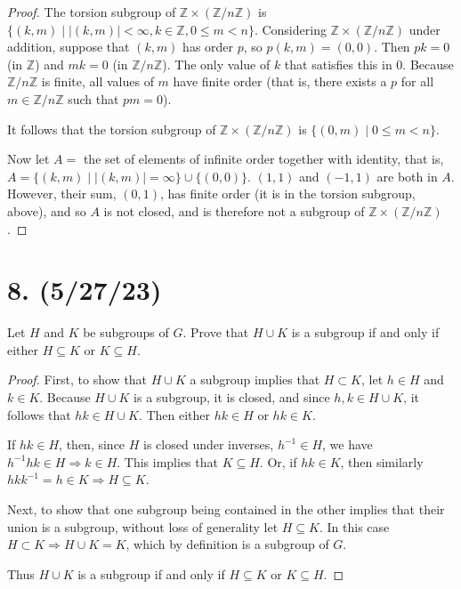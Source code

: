 \documentclass{article}
\begin{document}
\begin{proof}
    The torsion subgroup of $\mathbb{Z} \times (\mathbb{Z}/n\mathbb{Z})$ is $\{ (k, m) \mid |(k, m)| < \infty, k \in \mathbb{Z}, 0 \leq m < n \}$. Considering $\mathbb{Z} \times (\mathbb{Z}/n\mathbb{Z})$ under addition, suppose that $(k, m)$ has order $p$, so $p(k, m) = (0, 0)$. Then $pk = 0$ (in $\mathbb{Z}$) and $mk = 0$ (in $\mathbb{Z}/n\mathbb{Z}$). The only value of $k$ that satisfies this in 0. Because $\mathbb{Z}/n\mathbb{Z}$ is finite, all values of $m$ have finite order (that is, there exists a $p$ for all $m \in \mathbb{Z}/n\mathbb{Z}$ such that $pm = 0$).

    It follows that the torsion subgroup of $\mathbb{Z} \times (\mathbb{Z}/n\mathbb{Z})$ is $\{ (0, m) \mid 0 \leq m < n \}$.

    Now let $A = $ the set of elements of infinite order together with identity, that is, $A = \{ (k, m) \mid |(k, m)| = \infty \} \cup \{ (0, 0) \}$. $(1, 1)$ and $(-1, 1)$ are both in $A$. However, their sum, $(0, 1)$, has finite order (it is in the torsion subgroup, above), and so $A$ is not closed, and is therefore not a subgroup of $\mathbb{Z} \times (\mathbb{Z}/n\mathbb{Z})$.
\end{proof}

\section*{8. (5/27/23)}

Let $H$ and $K$ be subgroups of $G$. Prove that $H \cup K$ is a subgroup if and only if either $H \subseteq K$ or $K \subseteq H$.

\begin{proof}
    First, to show that $H \cup K$ a subgroup implies that $H \subset K$, let $h \in H$ and $k \in K$. Because $H \cup K$ is a subgroup, it is closed, and since $h, k \in H \cup K$, it follows that $hk \in H \cup K$. Then either $hk \in H$ or $hk \in K$.
    
    If $hk \in H$, then, since $H$ is closed under inverses, $h^{-1} \in H$, we have $h^{-1}hk \in H \Rightarrow k \in H$. This implies that $K \subseteq H$. Or, if $hk \in K$, then similarly $hkk^{-1} = h \in K \Rightarrow H \subseteq K$.

    Next, to show that one subgroup being contained in the other implies that their union is a subgroup, without loss of generality let $H \subseteq K$. In this case $H \subset K \Rightarrow H \cup K = K$, which by definition is a subgroup of $G$.

    Thus $H \cup K$ is a subgroup if and only if $H \subseteq K$ or $K \subseteq H$.
\end{proof}
\end{document}
